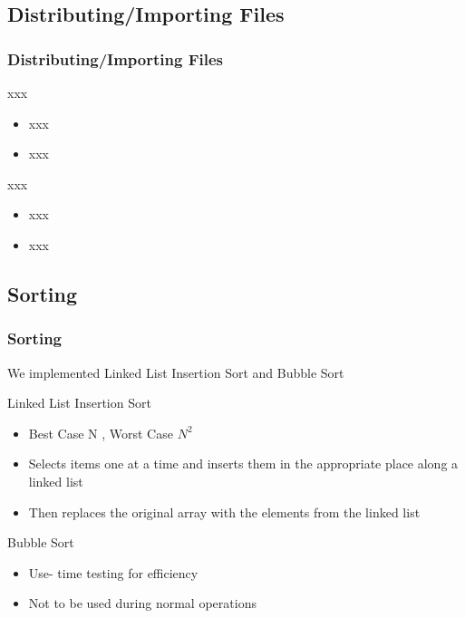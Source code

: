 \documentclass{beamer}
\begin{document}
\subsection{Distributing/Importing Files}

\begin{frame}	
	\frametitle{Distributing/Importing Files}
	
	\begin{block}{xxx}
		\begin{itemize}
			\item xxx
			\item xxx
		\end{itemize}
	\end{block}
	
	\begin{block}{xxx}
		\begin{itemize}
			\item xxx
			\item xxx
		\end{itemize}
	\end{block}
\end{frame}

\subsection{Sorting}

\begin{frame}    
    \frametitle{Sorting}
    
    We implemented Linked List Insertion Sort and Bubble Sort
    
    \begin{block}{Linked List Insertion Sort}
        \begin{itemize}
            \item Best Case N , Worst Case $N^2$
            \item Selects items one at a time and inserts them in the appropriate place along a linked list
            \item Then replaces the original array with the elements from the linked list
        \end{itemize}
    \end{block}
    
    \begin{block}{Bubble Sort}
        \begin{itemize}
            \item Use- time testing for efficiency
            \item Not to be used during normal operations
        \end{itemize}
    \end{block}
\end{frame}
\end{document}
